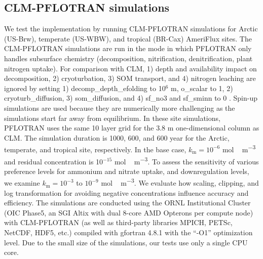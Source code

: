 \documentclass[gmd, manuscript]{copernicus}
\begin{document}
\subsection{CLM-PFLOTRAN simulations}
We test the implementation by running CLM-PFLOTRAN simulations for Arctic
(US-Brw), temperate (US-WBW), and tropical (BR-Cax) AmeriFlux sites. The
CLM-PFLOTRAN simulations are run in the mode in which PFLOTRAN only handles
subsurface chemistry (decomposition, nitrification, denitrification, plant
nitrogen uptake). For comparison with CLM, 1) depth and  availability
impact on decomposition, 2) cryoturbation, 3) SOM transport, and 4) nitrogen
leaching are ignored by setting 1) decomp\_depth\_efolding to 10$^6$ m,
o\_scalar to 1, 2) cryoturb\_diffusion, 3) som\_diffusion, and 4) sf\_no3 and
sf\_sminn to 0 \citep{Oleson2013}. Spin-up simulations are used because they are numerically more
challenging  as the simulations start far away from equilibrium. In these
site simulations, PFLOTRAN uses the same 10 layer grid for the 3.8 m
one-dimensional column as CLM. The simulation duration is 1000, 600, and 600
year for the Arctic, temperate, and tropical site, respectively.
In the base case, $k_\text{m}=10^{-6}$ \unit{mol\,m^{-3}} and
residual concentration is 10$^{-15}$ \unit{mol\,m^{-3}}. To assess the sensitivity
of various preference levels for ammonium and nitrate uptake, and
downregulation levels, we examine  $k_\text{m}=10^{-3}$ to $10^{-9}$
\unit{mol\,m^{-3}}. We evaluate how scaling, clipping, and log transformation for
avoiding negative concentrations influence accuracy and efficiency.
The simulations are conducted using the ORNL Institutional Cluster (OIC Phase5,
an SGI Altix with dual 8-core AMD Opterons per compute node) with CLM-PFLOTRAN
(as well as third-party libraries MPICH, PETSc, NetCDF, HDF5, etc.) compiled with gfortran 4.8.1 with the ``-O1'' optimization level.  
Due to the small size of the simulations, our tests use only a single CPU core.
\end{document}
